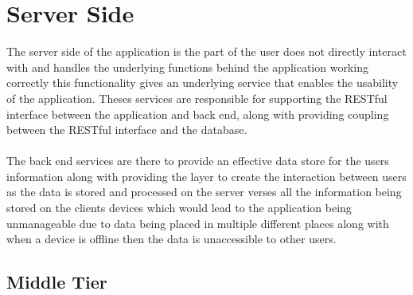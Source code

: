 \section{Server Side}

The server side of the application is the part of the user does not directly interact with and handles the underlying functions behind the application working correctly this functionality gives an underlying service that enables the usability of the application. Theses services are responsible for supporting the RESTful interface between the application and back end, along with providing coupling between the RESTful interface and the database.\\
\\
The back end services are there to provide an effective data store for the users information along with providing the layer to create the interaction between users as the data is stored and processed on the server verses all the information being stored on the clients devices which would lead to the application being unmanageable due to data being placed in multiple different places along with when a device is offline then the data is unaccessible to other users.\\

\subsection{Middle Tier}

